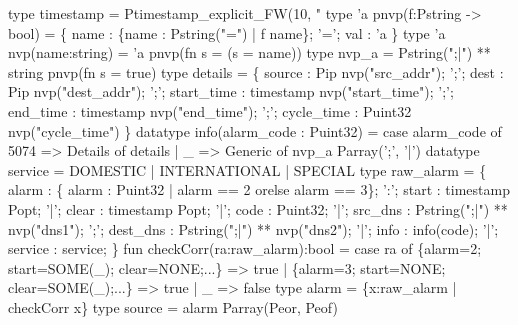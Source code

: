 \begin{code}
type timestamp = Ptimestamp_explicit_FW(10, "%
\mbox{}
type 'a pnvp(f:Pstring -> bool) =
      \{ name : \{name : Pstring("=") | f name\}; 
         '='; 
         val : 'a \}
type 'a nvp(name:string) = 'a pnvp(fn s = (s = name))
type nvp_a = Pstring(";|") ** string pnvp(fn s = true)
\mbox{}
type details = \{
      source      : Pip nvp("src_addr");
';';  dest        : Pip nvp("dest_addr");
';';  start_time  : timestamp nvp("start_time");
';';  end_time    : timestamp nvp("end_time");
';';  cycle_time  : Puint32 nvp("cycle_time")
\}
\mbox{}
datatype info(alarm_code : Puint32) =
  case alarm_code of 
    5074 => Details of details
  | _    => Generic of nvp_a Parray(';', '|')
\mbox{}
datatype service = DOMESTIC | INTERNATIONAL | SPECIAL
\mbox{}
type raw_alarm = \{
       alarm    : \{ alarm : Puint32 | alarm == 2 orelse alarm == 3\};
 ':';  start    : timestamp Popt;
 '|';  clear    : timestamp Popt;
 '|';  code     : Puint32;
 '|';  src_dns  : Pstring(";|") ** nvp("dns1");
 ';';  dest_dns : Pstring(";|") ** nvp("dns2");
 '|';  info     : info(code);
 '|';  service  : service;
\}
\mbox{}
fun checkCorr(ra:raw_alarm):bool =
  case ra of 
    \{alarm=2; start=SOME(_); clear=NONE;...\} => true
  | \{alarm=3; start=NONE;    clear=SOME(_);...\} => true
  |  _ => false
\mbox{}
type alarm = \{x:raw_alarm | checkCorr x\}
\mbox{}
type source = alarm Parray(Peor, Peof)
\end{code}
